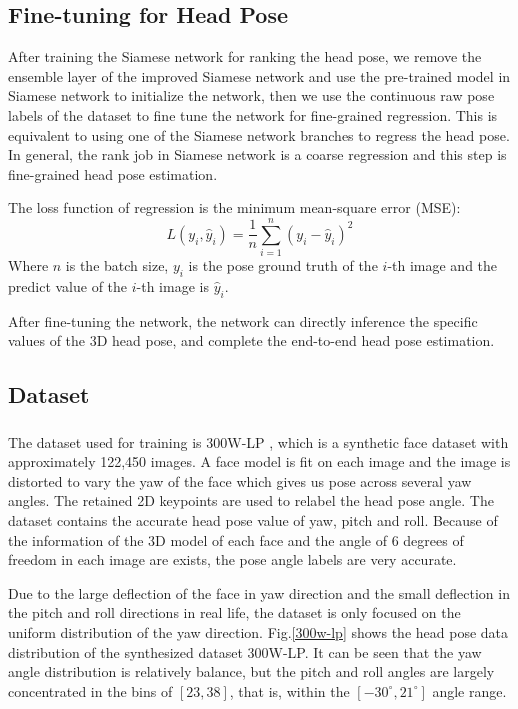 \documentclass[english]{DDCLSconf}
\newcommand{\upcite}[1]{\textsuperscript{\textsuperscript{\cite{#1}}}}%
\begin{document}
\subsection{Fine-tuning for Head Pose}
After training the Siamese network for ranking the head pose, we remove the ensemble layer of the improved Siamese network and use the pre-trained model in Siamese network to initialize the network, then we use the continuous raw pose labels of the dataset to fine tune the network for fine-grained regression. This is equivalent to using one of the Siamese network branches to regress the head pose. In general, the rank job in Siamese network is a coarse regression and this step is fine-grained head pose estimation.

The loss function of regression is the minimum mean-square error (MSE):
\begin{equation}
L\left ( y_i,\hat{y}_i \right )=\frac{1}{n}\sum_{i=1}^{n}\left ( y_i-\hat{y}_i \right )^2
\end{equation}
Where $n$ is the batch size, $y_i$ is the pose ground truth of the $i$-th image and the predict value of the $i$-th image is $\hat{y}_i$.

After fine-tuning the network, the network can directly inference the specific values of the 3D head pose, and complete the end-to-end head pose estimation.

\subsection{Dataset}
The dataset used for training is 300W-LP \upcite{300w-lp}, which is a synthetic face dataset with approximately 122,450 images. A face model is fit on each image and the image is distorted to vary the yaw of the face which gives us pose across several yaw angles. The retained 2D keypoints are used to relabel the head pose angle. The dataset contains the accurate head pose value of yaw, pitch and roll. Because of the information of the 3D model of each face and the angle of 6 degrees of freedom in each image are exists, the pose angle labels are very accurate. 

Due to the large deflection of the face in yaw direction and the small deflection in the pitch and roll directions in real life, the dataset is only focused on the uniform distribution of the yaw direction. Fig.\ref{300w-lp} shows the head pose data distribution of the synthesized dataset 300W-LP. It can be seen that the yaw angle distribution is relatively balance, but the pitch and roll angles are largely concentrated in the bins of $[23, 38]$, that is, within the $[-30^{\circ}, 21^{\circ}]$ angle range.
\end{document}
